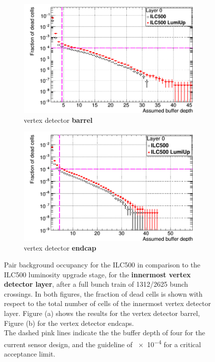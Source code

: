 \begin{figure}[!h]
 \centering
  \begin{subfigure}[b]{0.49\textwidth}
   \centering
    \includegraphics[width=\textwidth]{Figures/Pairs/Occupancy_Comparison_Layer_0_deadcells_ILC500vsLumiUp_SiVertexBarrel_corrected_Barrel_size.png}
   \caption{\sid vertex detector \textbf{barrel}}
   \end{subfigure}
   \hfill
    \begin{subfigure}[b]{0.49\textwidth}
   \centering
    \includegraphics[width=\textwidth]{Figures/Pairs/Occupancy_Comparison_Layer_0_deadcells_ILC500_LumiUp_SiVertexEndcap.png}
   \caption{\sid vertex detector \textbf{endcap}}
   \end{subfigure}
   \caption[Pair background occupancy in the \sid vertex detector for the ILC500 and the ILC500 ``Lumi Up'']{Pair background occupancy for the ILC500 in comparison to the ILC500 luminosity upgrade stage, for the \textbf{innermost \sid vertex detector layer}, after a full bunch train of \num{1312}/\num{2625} bunch crossings.
   In both figures, the fraction of dead cells is shown with respect to the total number of cells of the innermost vertex detector layer.
   Figure (a) shows the results for the vertex detector barrel, Figure (b) for the vertex detector endcaps.
   \\The dashed pink lines indicate the the buffer depth of four for the current sensor design, and the guideline of \num{e-4} for a critical acceptance limit.
   }
   \label{fig:PairBkg:ILC500-ILC500LumiUp_Occupancy}
 \end{figure}

